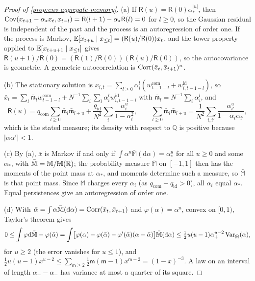 \begin{proof}[Proof of \cref{prop:env-aggregate-memory}]
(a) If $\mathsf R(u)=\mathsf R(0)\alpha_\ast^{\lvert u\rvert}$, then $\operatorname{Cov}(x_{t+1}-\alpha_\ast x_t,x_{t-l})=\mathsf R(l+1)-\alpha_\ast\mathsf R(l)=0$ for $l\ge0$, so the Gaussian residual is independent of the past and the process is an autoregression of order one. If the process is Markov, $\mathbb{E}[x_{t+u}\mid x_{\le t}]=(\mathsf R(u)/\mathsf R(0))x_t$, and the tower property applied to $\mathbb{E}[x_{t+u+1}\mid x_{\le t}]$ gives $\mathsf R(u+1)/\mathsf R(0)=(\mathsf R(1)/\mathsf R(0))(\mathsf R(u)/\mathsf R(0))$, so the autocovariance is geometric. A geometric autocorrelation is $\operatorname{Corr}(\bar x_t,\bar x_{t+1})^u$.

(b) The stationary solution is $x_{i,t}=\sum_{l\ge0}\alpha_i^l(w^{\mathrm{com}}_{t-1-l}+w^{\mathrm{id}}_{i,t-1-l})$, so $\bar x_t=\sum_l\bar{\mathfrak m}_lw^{\mathrm{com}}_{t-1-l}+N^{-1}\sum_i\sum_l\alpha_i^lw^{\mathrm{id}}_{i,t-1-l}$ with $\bar{\mathfrak m}_l=N^{-1}\sum_i\alpha_i^l$, and
\[
\mathsf R(u)=q_{\mathrm{com}}\sum_{l\ge0}\bar{\mathfrak m}_l\bar{\mathfrak m}_{l+u}+\frac{q_{\mathrm{id}}}{N^2}\sum_i\frac{\alpha_i^u}{1-\alpha_i^2},\qquad\sum_{l\ge0}\bar{\mathfrak m}_l\bar{\mathfrak m}_{l+u}=\frac1{N^2}\sum_{i,i'}\frac{\alpha_{i'}^u}{1-\alpha_i\alpha_{i'}},
\]
which is the stated measure; its density with respect to $\mathbb Q$ is positive because $\lvert\alpha\alpha'\rvert<1$.

(c) By (a), $\bar x$ is Markov if and only if $\int\alpha^u\bar{\mathbb M}(\mathrm d\alpha)=\alpha_\ast^u$ for all $u\ge0$ and some $\alpha_\ast$, with $\bar{\mathbb M}=\mathbb M/\mathbb M(\mathbb{R})$; the probability measure $\bar{\mathbb M}$ on $[-1,1]$ then has the moments of the point mass at $\alpha_\ast$, and moments determine such a measure, so $\bar{\mathbb M}$ is that point mass. Since $\mathbb M$ charges every $\alpha_i$ (as $q_{\mathrm{com}}+q_{\mathrm{id}}>0$), all $\alpha_i$ equal $\alpha_\ast$. Equal persistences give an autoregression of order one.

(d) With $\bar\alpha=\int\alpha\bar{\mathbb M}(\mathrm d\alpha)=\operatorname{Corr}(\bar x_t,\bar x_{t+1})$ and $\varphi(\alpha)=\alpha^u$, convex on $[0,1)$, Taylor's theorem gives
\[
0\le\int\varphi\mathrm d\bar{\mathbb M}-\varphi(\bar\alpha)=\int\bigl[\varphi(\alpha)-\varphi(\bar\alpha)-\varphi'(\bar\alpha)(\alpha-\bar\alpha)\bigr]\bar{\mathbb M}(\mathrm d\alpha)\le\tfrac12u(u-1)\alpha_+^{u-2}\operatorname{Var}_{\bar{\mathbb M}}(\alpha),
\]
for $u\ge2$ (the error vanishes for $u\le1$), and $\frac12u(u-1)x^{u-2}\le\sum_{\mathsf m\ge2}\frac12\mathsf m(\mathsf m-1)x^{\mathsf m-2}=(1-x)^{-3}$. A law on an interval of length $\alpha_+-\alpha_-$ has variance at most a quarter of its square.


\end{proof}
